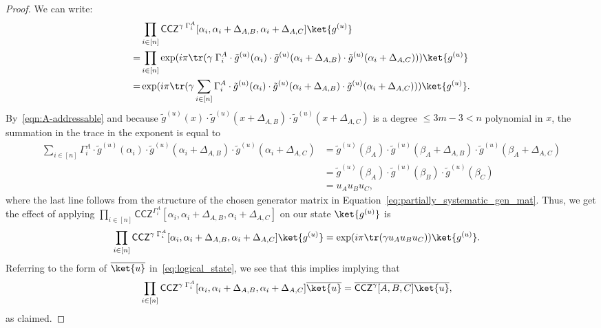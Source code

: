 \documentclass[11pt]{article}
\theoremstyle{definition}
\renewcommand{\le}{\leqslant}
\newcommand{\CCZ}{\mathsf{CCZ}}
\newcommand*{\ol}{\overline}
\begin{document}
\begin{proof}
    We can write:
    \begin{align}
        &\prod_{i \in [n]} \CCZ^{\gamma\;\Gamma^A_i}[\alpha_i, \alpha_i + \Delta_{A,B}, \alpha_i + \Delta_{A,C}] \ket{g^{(u)}} \\ 
        = &\prod_{i \in [n]} \exp(i\pi \tr(\gamma\;\Gamma^A_i \cdot \tilde{g}^{(u)}(\alpha_i) \cdot \tilde{g}^{(u)}(\alpha_i + \Delta_{A,B}) \cdot \tilde{g}^{(u)}(\alpha_i + \Delta_{A,C}) )) \ket{g^{(u)}} \\
        = &\exp(i\pi \tr(\gamma\sum_{i \in [n]} \Gamma^A_i \cdot \tilde{g}^{(u)}(\alpha_i) \cdot \tilde{g}^{(u)}(\alpha_i + \Delta_{A,B}) \cdot \tilde{g}^{(u)}(\alpha_i + \Delta_{A,C}) )) \ket{g^{(u)}}.
    \end{align}
    By~\eqref{eqn:A-addressable} and because $\tilde{g}^{(u)}(x) \cdot \tilde{g}^{(u)}(x + \Delta_{A,B}) \cdot \tilde{g}^{(u)}(x + \Delta_{A,C})$ is a degree $\le 3m-3 < n$ polynomial in $x$, the summation in the trace in the exponent is equal to
    \begin{align}
        \sum_{i \in [n]}\Gamma^A_i \cdot \tilde{g}^{(u)}(\alpha_i) \cdot \tilde{g}^{(u)}(\alpha_i + \Delta_{A,B}) \cdot \tilde{g}^{(u)}(\alpha_i + \Delta_{A,C})
        &= \tilde{g}^{(u)}(\beta_A) \cdot \tilde{g}^{(u)}(\beta_A + \Delta_{A,B}) \cdot \tilde{g}^{(u)}(\beta_A + \Delta_{A,C}) \\
        &= \tilde{g}^{(u)}(\beta_A) \cdot \tilde{g}^{(u)}(\beta_B) \cdot \tilde{g}^{(u)}(\beta_C) \\
        &= u_A u_B u_C,
    \end{align}
    where the last line follows from the structure of the chosen generator matrix in Equation~\eqref{eq:partially_systematic_gen_mat}.
    Thus, we get the effect of applying $\prod_{i \in [n]} \CCZ^{\Gamma^A_i}[\alpha_i, \alpha_i + \Delta_{A,B}, \alpha_i + \Delta_{A,C}]$ on our state $\ket{g^{(u)}}$ is 
    \begin{align}
        \prod_{i \in [n]} \CCZ^{\gamma\;\Gamma^A_i}[\alpha_i, \alpha_i + \Delta_{A,B}, \alpha_i + \Delta_{A,C}] \ket{g^{(u)}} 
        &= \exp(i\pi \tr(\gamma u_A u_B u_C)) \ket{g^{(u)}}.
    \end{align}
    Referring to the form of $\overline{\ket{u}}$ in~\eqref{eq:logical_state}, we see that this implies
    implying that 
    \begin{align}
        \prod_{i \in [n]} \CCZ^{\gamma\;\Gamma^A_i}[\alpha_i, \alpha_i + \Delta_{A,B}, \alpha_i + \Delta_{A,C}] \ol{\ket{u}} 
        &= \ol{\CCZ^\gamma[A,B,C]} \ol{\ket{u}},
    \end{align}
    as claimed.
\end{proof}
\end{document}

